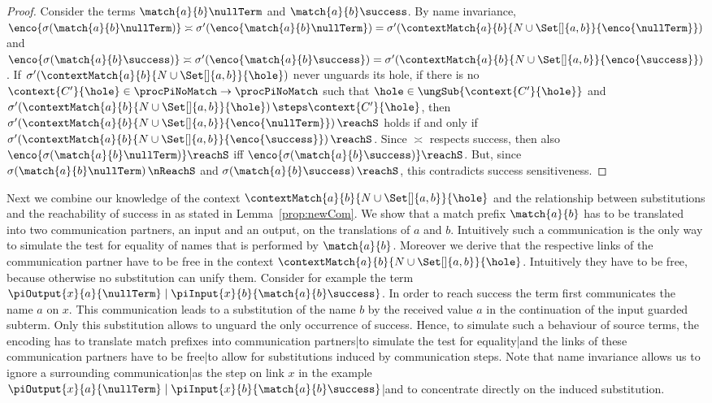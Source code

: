 \documentclass[]{article}
\begin{document}
\begin{proof}
	Consider the terms $ \match{a}{b}\nullTerm $ and $ \match{a}{b}\success $. By name invariance, $ \enco{\sigma\!\left( \match{a}{b}\nullTerm \right)} \asymp \sigma'\!\left( \enco{\match{a}{b}\nullTerm} \right) = \sigma'\!\left( \contextMatch{a}{b}{N \cup \Set[]{ a, b }}{\enco{\nullTerm}} \right) $ and $ \enco{\sigma\!\left( \match{a}{b}\success \right)} \asymp \sigma'\!\left( \enco{\match{a}{b}\success} \right) = \sigma'\!\left( \contextMatch{a}{b}{N \cup \Set[]{ a, b }}{\enco{\success}} \right) $. If $ \sigma'\!\left( \contextMatch{a}{b}{N \cup \Set[]{ a, b }}{\hole} \right) $ never unguards its hole, \ie if there is no $ \context{C'}{\hole} \in \procPiNoMatch \to \procPiNoMatch $ such that $ \hole \in \ungSub{\context{C'}{\hole}} $ and $ \sigma'\!\left( \contextMatch{a}{b}{N \cup \Set[]{ a, b }}{\hole} \right) \steps \context{C'}{\hole} $, then $ \sigma'\!\left( \contextMatch{a}{b}{N \cup \Set[]{ a, b }}{\enco{\nullTerm}} \right) \reachS $ holds if and only if $ \sigma'\!\left( \contextMatch{a}{b}{N \cup \Set[]{ a, b }}{\enco{\success}} \right) \reachS $. Since $ \asymp $ respects success, then also $ \enco{\sigma\!\left( \match{a}{b}\nullTerm \right)} \reachS $ iff $ \enco{\sigma\!\left( \match{a}{b}\success \right)} \reachS $. But, since $ \sigma\!\left( \match{a}{b}\nullTerm \right) \nReachS $ and $ \sigma\!\left( \match{a}{b}\success \right) \reachS $, this contradicts success sensitiveness.
\end{proof}

Next we combine our knowledge of the context $ \contextMatch{a}{b}{N \cup \Set[]{ a, b }}{\hole} $ and the relationship between substitutions and the reachability of success in \piNM as stated in Lemma~\ref{prop:newCom}. We show that a match prefix $ \match{a}{b} $ has to be translated into two communication partners, \ie an input and an output, on the translations of $ a $ and $ b $. Intuitively such a communication is the only way to simulate the test for equality of names that is performed by $ \match{a}{b} $. Moreover we derive that the respective links of the communication partner have to be free in the context $ \contextMatch{a}{b}{N \cup \Set[]{ a, b }}{\hole} $. Intuitively they have to be free, because otherwise no substitution can unify them. Consider for example the term $ \piOutput{x}{a}{\nullTerm} \mid \piInput{x}{b}{\match{a}{b}\success} $. In order to reach success the term first communicates the name $ a $ on $ x $. This communication leads to a substitution of the name $ b $ by the received value $ a $ in the continuation of the input guarded subterm. Only this substitution allows to unguard the only occurrence of success. Hence, to simulate such a behaviour of source terms, the encoding has to translate match prefixes into communication {partners}|{to} simulate the test for {equality}|{and} the links of these communication partners have to be {free}|{to} allow for substitutions induced by communication steps. Note that name invariance allows us to ignore a surrounding {communication}|{as} the step on link $ x $ in the example $ \piOutput{x}{a}{\nullTerm} \mid \piInput{x}{b}{\match{a}{b}\success} $|{and} to concentrate directly on the induced substitution.
\end{document}
